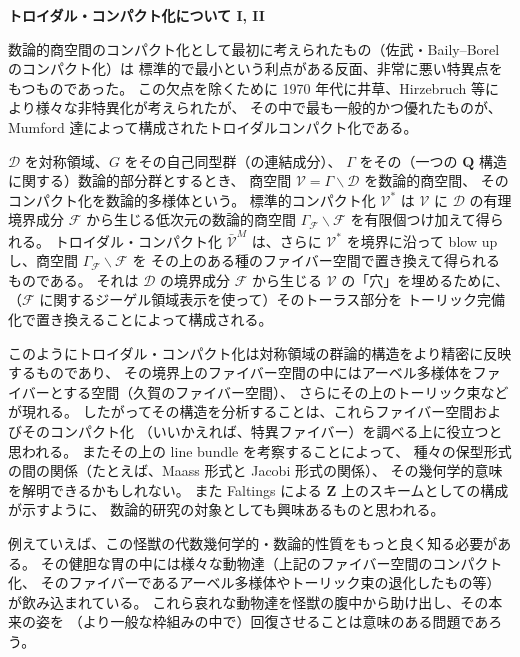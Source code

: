 \documentclass[uplatex,dvipdfmx]{jlreq}
\begin{document}
\noindent
{\large\bfseries トロイダル・コンパクト化について I, II}

\medskip
\hspace*{\fill}{\large\bfseries 佐武 一郎（中央大学・理工）}

\bigskip\bigskip

数論的商空間のコンパクト化として最初に考えられたもの（佐武・Baily--Borel のコンパクト化）は
標準的で最小という利点がある反面、非常に悪い特異点をもつものであった。
この欠点を除くために 1970 年代に井草、Hirzebruch 等により様々な非特異化が考えられたが、
その中で最も一般的かつ優れたものが、Mumford 達によって構成されたトロイダルコンパクト化である。

$\mathcal{D}$ を対称領域、$G$ をその自己同型群（の連結成分）、
$\Gamma$ をその（一つの $\mathbf{Q}$ 構造に関する）数論的部分群とするとき、
商空間 $\mathcal{V} = \Gamma \backslash \mathcal{D}$ を数論的商空間、
そのコンパクト化を数論的多様体という。
標準的コンパクト化 $\mathcal{V}^{\ast}$ は $\mathcal{V}$ に
$\mathcal{D}$ の有理境界成分 $\mathcal{F}$ から生じる低次元の数論的商空間
$\Gamma_{\mathcal{F}} \backslash \mathcal{F}$ を有限個つけ加えて得られる。
トロイダル・コンパクト化 $\bar{\mathcal{V}}^M$ は、さらに $\mathcal{V}^{\ast}$ を境界に沿って
blow up し、商空間 $\Gamma_{\mathcal{F}} \backslash \mathcal{F}$ を
その上のある種のファイバー空間で置き換えて得られるものである。
それは $\mathcal{D}$ の境界成分 $\mathcal{F}$ から生じる $\mathcal{V}$ の「穴」を埋めるために、
（$\mathcal{F}$ に関するジーゲル領域表示を使って）そのトーラス部分を
トーリック完備化で置き換えることによって構成される。

\medskip

このようにトロイダル・コンパクト化は対称領域の群論的構造をより精密に反映するものであり、
その境界上のファイバー空間の中にはアーベル多様体をファイバーとする空間（久賀のファイバー空間）、
さらにその上のトーリック束などが現れる。
したがってその構造を分析することは、これらファイバー空間およびそのコンパクト化
（いいかえれば、特異ファイバー）を調べる上に役立つと思われる。
またその上の line bundle を考察することによって、
種々の保型形式の間の関係（たとえば、Maass 形式と Jacobi 形式の関係）、
その幾何学的意味を解明できるかもしれない。
また Faltings による $\mathbf{Z}$ 上のスキームとしての構成が示すように、
数論的研究の対象としても興味あるものと思われる。

\medskip

例えていえば、この怪獣の代数幾何学的・数論的性質をもっと良く知る必要がある。
その健胆な胃の中には様々な動物達（上記のファイバー空間のコンパクト化、
そのファイバーであるアーベル多様体やトーリック束の退化したもの等）が飲み込まれている。
これら哀れな動物達を怪獣の腹中から助け出し、その本来の姿を
（より一般な枠組みの中で）回復させることは意味のある問題であろう。
\end{document}
